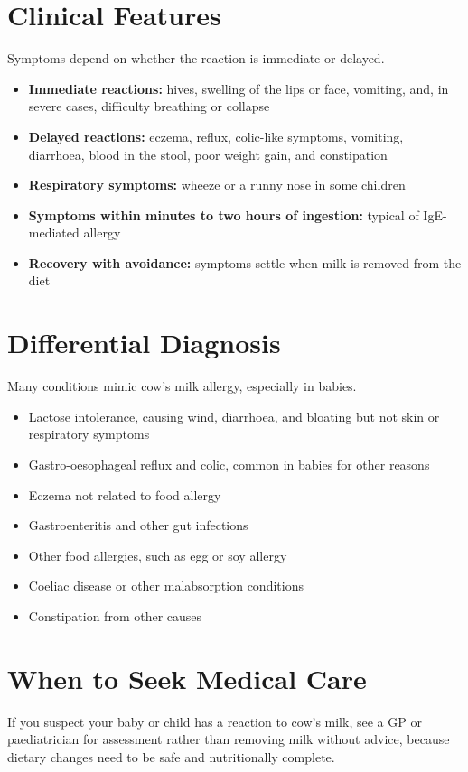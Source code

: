 \section*{Clinical Features}
Symptoms depend on whether the reaction is immediate or delayed.

\begin{itemize}
    \item \textbf{Immediate reactions:} hives, swelling of the lips or face, vomiting, and, in severe cases, difficulty breathing or collapse
    \item \textbf{Delayed reactions:} eczema, reflux, colic-like symptoms, vomiting, diarrhoea, blood in the stool, poor weight gain, and constipation
    \item \textbf{Respiratory symptoms:} wheeze or a runny nose in some children
    \item \textbf{Symptoms within minutes to two hours of ingestion:} typical of IgE-mediated allergy
    \item \textbf{Recovery with avoidance:} symptoms settle when milk is removed from the diet
\end{itemize}

\section*{Differential Diagnosis}
Many conditions mimic cow's milk allergy, especially in babies.

\begin{itemize}
    \item Lactose intolerance, causing wind, diarrhoea, and bloating but not skin or respiratory symptoms
    \item Gastro-oesophageal reflux and colic, common in babies for other reasons
    \item Eczema not related to food allergy
    \item Gastroenteritis and other gut infections
    \item Other food allergies, such as egg or soy allergy
    \item Coeliac disease or other malabsorption conditions
    \item Constipation from other causes
\end{itemize}

\section*{When to Seek Medical Care}
If you suspect your baby or child has a reaction to cow's milk, see a GP or paediatrician for assessment rather than removing milk without advice, because dietary changes need to be safe and nutritionally complete.

